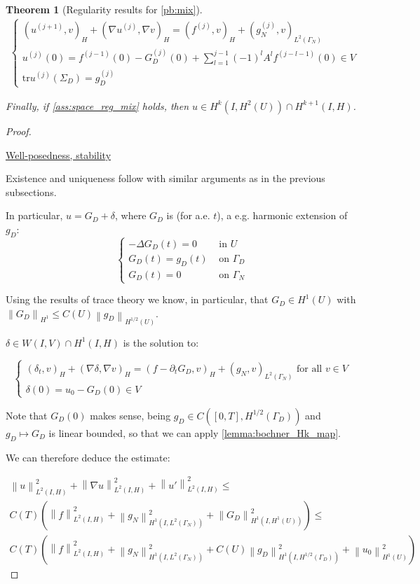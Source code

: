 \documentclass[english,a4paper,9pt,oneside]{scrbook}	%
\theoremstyle{break}
\newtheorem{thm}[equation]{Theorem}
\newenvironment{mproof}[1][\proofname]{%
  \begin{proof}[#1]$ $\par\nobreak\ignorespaces
}{%
  \end{proof}
}
\renewcommand*{\proofname}{Proof}
\theoremstyle{remark}
\newcommand{\norm}[1]{\left\lVert#1\right\rVert}
\newcommand{\tr}{\text{tr}}
\begin{document}
\begin{appendices}
\begin{thm}[Regularity results for \cref{pb:mix}]
\begin{align*}
	\left\{\begin{matrix}
(u^{(j+1)},v)_H + (\nabla u^{(j)}, \nabla v)_H = ( f^{(j)}, v)_H + (g_N^{(j)}, v)_{L^2(\Gamma_N)} \\
u^{(j)}(0) = f^{(j-1)}(0) - G_D^{(j)}(0) + \sum_{l=1}^{j-1}(-1)^l A^l f^{(j-l-1)}(0)   \in V \\
\tr u^{(j)}(\Sigma_D) = g_D^{(j)}
\end{matrix}\right.
\end{align*}


Finally, if \cref{ass:space_reg_mix} holds, then $u \in H^{k}(I,H^2(U)) \cap H^{k+1}(I,H)$.

\end{thm}

\begin{mproof}

\underline{Well-posedness, stability}

Existence and uniqueness follow with similar arguments as in the previous subsections.

In particular, $u=G_D + \delta$, where $G_D$ is (for a.e. $t$), a e.g. harmonic extension of $g_D$:
$$
\left\{\begin{matrix}
-\Delta G_D(t) = 0 & \text{ in } U\\ 
G_D(t) = g_D(t) & \text{ on } \Gamma_D\\ 
G_D(t) = 0 & \text{ on } \Gamma_N 
\end{matrix}\right.
$$

Using the results of trace theory we know, in particular, that $G_D \in H^1(U)$ with $\norm{G_D}_{H^1}\leq C(U) \norm{g_D}_{H^{1/2}(U)}$.

$\delta \in W(I,V) \cap H^1(I,H)$ is the solution to:

$$
\left\{\begin{matrix}
(\delta_t,v)_H + (\nabla \delta, \nabla v)_H = (f - \partial_t G_D,v)_H + (g_N,v)_{L^2(\Gamma_N)} \text{ for all } v \in V\\ 
\delta(0) = u_0 - G_D(0) \in V
\end{matrix}\right.
$$

Note that $G_D(0)$ makes sense, being $g_D \in C([0,T], H^{1/2}(\Gamma_D))$ and $g_D \mapsto G_D$ is linear bounded, so that we can apply \cref{lemma:bochner_Hk_map}.

We can therefore deduce the estimate:

\begin{align*}
	\norm{u}^2_{L^2(I,H)}+\norm{\nabla u}^2_{L^2(I,H)} + \norm{u'}^2_{L^2(I,H)} \leq \\
	C(T)\left (  \norm{f}_{L^2(I,H)}^2 +  \norm{g_N}^2_{H^1(I,L^2(\Gamma_N))}  + \norm{G_D}^2_{H^1(I,H^1(U))}\right )  \leq \\
	C(T)\left (  \norm{f}_{L^2(I,H)}^2 +  \norm{g_N}^2_{H^1(I,L^2(\Gamma_N))} + C(U) \norm{g_D}^2_{H^1(I,H^{1/2}(\Gamma_D))} + \norm{u_0}^2_{H^1(U)}\right )
\end{align*}


\end{mproof}
\end{appendices}
\end{document}
